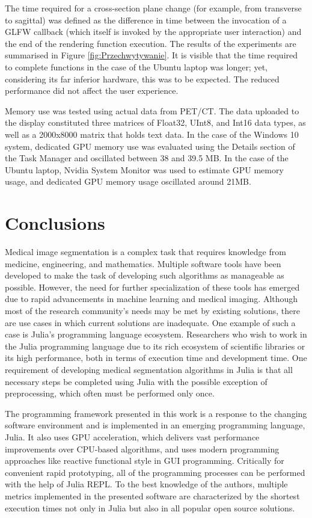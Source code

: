 \documentclass{juliacon}
\begin{document}
The time required for a cross-section plane change (for example, from transverse to sagittal) was defined as the difference in time between the invocation of a GLFW callback (which itself is invoked by the appropriate user interaction) and the end of the rendering function execution.
The results of the experiments are summarised in Figure \ref{fig:Przechwytywanie}. It is visible that the time required to complete functions in the case of the Ubuntu laptop was longer; yet, considering its far inferior hardware, this was to be expected. The reduced performance did not affect the user experience.


Memory use was tested using actual data from PET/CT. The data uploaded to the display constituted three matrices of Float32, UInt8,  and Int16 data types, as well as a 2000x8000 matrix that holds text data. 
In the case of the Windows 10 system, dedicated GPU memory use was evaluated using the Details section of the Task Manager and oscillated between 38 and 39.5 MB. In the case of the Ubuntu laptop, Nvidia System Monitor was used to estimate GPU memory usage, and dedicated GPU memory usage oscillated around 21MB. 

\section{Conclusions}
Medical image segmentation is a complex task that requires knowledge from medicine, engineering, and mathematics. Multiple software tools have been developed to make the task of developing such algorithms as manageable as possible. However, the need for further specialization of these tools has emerged due to rapid advancements in machine learning and medical imaging. Although most of the research community's needs may be met by existing solutions, there are use cases in which current solutions are inadequate. One example of such a case is Julia's programming language ecosystem. 
Researchers who wish to work in the Julia programming language due to its rich ecosystem of scientific libraries or its high performance, both in terms of execution time and development time. One requirement of developing medical segmentation algorithms in Julia is that all necessary steps be completed using Julia with the possible exception of preprocessing, which often must be performed only once.

The programming framework presented in this work is a response to the changing software environment and is implemented in an emerging programming language, Julia. It also uses GPU acceleration, which delivers vast performance improvements over CPU-based algorithms, and uses modern programming approaches like reactive functional style in GUI programming. Critically for convenient rapid prototyping, all of the programming processes can be performed with the help of Julia REPL. To the best knowledge of the authors, multiple metrics implemented in the presented software are characterized by the shortest execution times not only in Julia but also in all popular open source solutions. 
\end{document}
